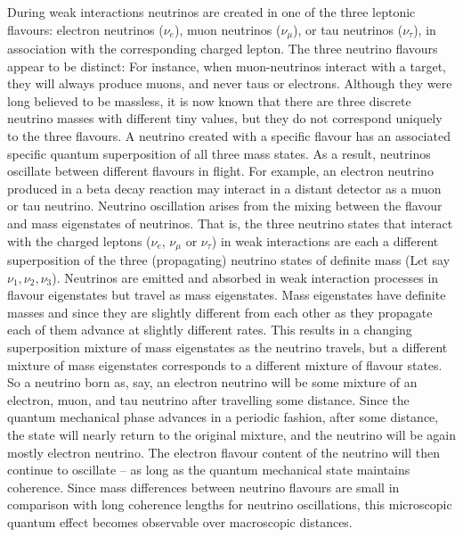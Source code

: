 \documentclass[12pt,a4paper]{report}
\begin{document}
During weak interactions neutrinos are created in one of the three leptonic flavours: electron neutrinos ($\nu_{e}$), muon neutrinos ($\nu_{\mu}$), or tau neutrinos ($\nu_{\tau}$), in association with the corresponding charged lepton. The three neutrino flavours appear to be distinct: For instance, when muon-neutrinos interact with a target, they will always produce muons, and never taus or electrons. Although they were long believed to be massless, it is now known that there are three discrete neutrino masses with different tiny values, but they do not correspond uniquely to the three flavours. A neutrino created with a specific flavour has an associated specific quantum superposition of all three mass states. As a result, neutrinos oscillate between different flavours in flight. For example, an electron neutrino produced in a beta decay reaction may interact in a distant detector as a muon or tau neutrino. Neutrino oscillation arises from the mixing between the flavour and mass eigenstates of neutrinos. That is, the three neutrino states that interact with the charged leptons ($\nu_{e}$, $\nu_{\mu}$ or $\nu_{\tau}$) in weak interactions are each a different superposition of the three (propagating) neutrino states of definite mass (Let say $\nu_{1},\nu_{2},\nu_{3}$). Neutrinos are emitted and absorbed in weak interaction processes in flavour eigenstates but travel as mass eigenstates\cite{Aartsen}. Mass eigenstates have definite masses and since they are slightly different from each other as they propagate each of them advance at slightly different rates. This results in a changing superposition mixture of mass eigenstates as the neutrino travels, but a different mixture of mass eigenstates corresponds to a different mixture of flavour states. So a neutrino born as, say, an electron neutrino will be some mixture of an electron, muon, and tau neutrino after travelling some distance. Since the quantum mechanical phase advances in a periodic fashion, after some distance, the state will nearly return to the original mixture, and the neutrino will be again mostly electron neutrino. The electron flavour content of the neutrino will then continue to oscillate – as long as the quantum mechanical state maintains coherence. Since mass differences between neutrino flavours are small in comparison with long coherence lengths for neutrino oscillations, this microscopic quantum effect becomes observable over macroscopic distances.\par
\end{document}
